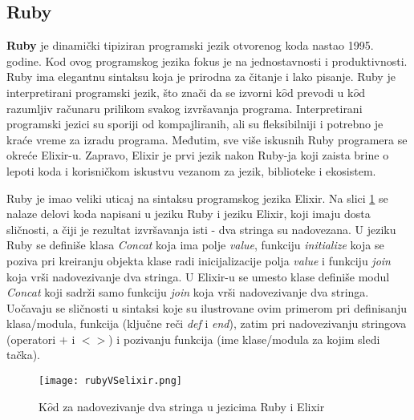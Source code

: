 \documentclass[12pt,oneside]{memoir}
\begin{document}
\subsection{Ruby}
\textbf{Ruby} je dinamički tipiziran programski jezik otvorenog koda nastao 1995. godine. Kod ovog programskog jezika fokus je na jednostavnosti i produktivnosti. Ruby ima elegantnu sintaksu koja je prirodna za čitanje i lako pisanje.
Ruby je interpretirani programski jezik, što znači da se izvorni k$\hat{o}$d prevodi u k$\hat{o}$d razumljiv računaru prilikom svakog izvršavanja programa. Interpretirani programski jezici su sporiji od kompajliranih, ali su fleksibilniji i potrebno je kraće vreme za izradu programa.
Međutim, sve više iskusnih Ruby programera se okreće Elixir-u. Zapravo, Elixir je prvi jezik nakon Ruby-ja koji zaista brine o lepoti koda i korisničkom iskustvu vezanom za jezik, biblioteke i ekosistem. 

Ruby je imao veliki uticaj na sintaksu programskog jezika Elixir. Na slici \ref{fig:RubyElixirCode} se nalaze delovi koda napisani u jeziku Ruby i jeziku Elixir, koji imaju dosta sličnosti, a čiji je rezultat izvršavanja isti - dva stringa su nadovezana. U jeziku Ruby se definiše klasa \textit{Concat} koja ima polje \textit{value}, funkciju \textit{initialize} koja se poziva pri kreiranju objekta klase radi inicijalizacije polja \textit{value} i funkciju \textit{join} koja vrši nadovezivanje dva stringa. U Elixir-u se umesto klase definiše modul \textit{Concat} koji sadrži samo funkciju \textit{join} koja vrši nadovezivanje dva stringa. Uočavaju se sličnosti u sintaksi koje su ilustrovane ovim primerom pri definisanju klasa/modula, funkcija (ključne reči \textit{def} i \textit{end}), zatim pri nadovezivanju stringova (operatori $+$ i $<>$) i pozivanju funkcija (ime klase/modula za kojim sledi tačka).

\begin{figure}[!ht]
  \centering
  \texttt{[image: rubyVSelixir.png]}
  \caption{K$\hat{o}$d za nadovezivanje dva stringa u jezicima Ruby i Elixir}
  \label{fig:RubyElixirCode}
\end{figure}
\end{document}
